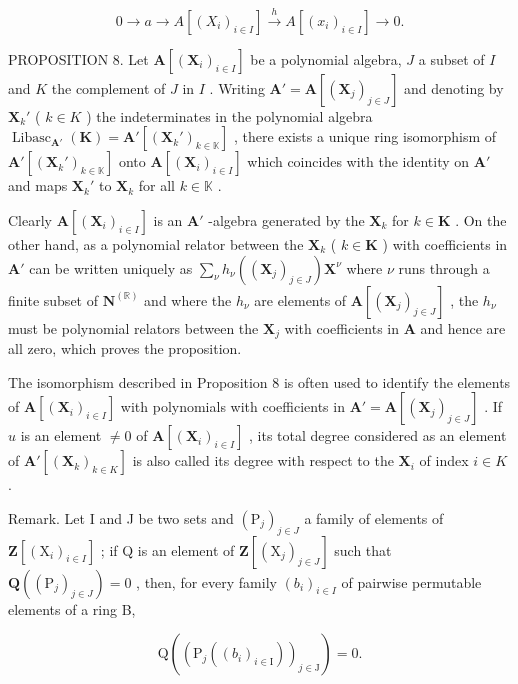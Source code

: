 \[
0 \longrightarrow a \longrightarrow A [ (X _ {i}) _ {i \in I} ] \stackrel {h} {\longrightarrow} A [ (x _ {i}) _ {i \in I} ] \longrightarrow 0.
\]

PROPOSITION 8. Let \(\mathbf{A}[(\mathbf{X}_i)_{i\in I}]\) be a polynomial algebra, \(J\) a subset of \(I\) and \(K\) the complement of \(J\) in \(I\) . Writing \(\mathbf{A}' = \mathbf{A}[(\mathbf{X}_j)_{j\in J}]\) and denoting by \(\mathbf{X}_k'\) ( \(k\in K\) ) the indeterminates in the polynomial algebra \(\operatorname{Libasc}_{\mathbf{A}'}(\mathbf{K}) = \mathbf{A}'[(\mathbf{X}_k')_{k \in \mathbb{K}}]\) , there exists a unique ring isomorphism of \(\mathbf{A}'[(\mathbf{X}_k')_{k \in \mathbb{K}}]\) onto \(\mathbf{A}[(\mathbf{X}_i)_{i \in I}]\) which coincides with the identity on \(\mathbf{A}'\) and maps \(\mathbf{X}_k'\) to \(\mathbf{X}_k\) for all \(k \in \mathbb{K}\) .

Clearly \(\mathbf{A}[(\mathbf{X}_i)_{i\in I}]\) is an \(\mathbf{A}'\) -algebra generated by the \(\mathbf{X}_k\) for \(k\in \mathbf{K}\) . On the other hand, as a polynomial relator between the \(\mathbf{X}_k\) ( \(k\in \mathbf{K}\) ) with coefficients in \(\mathbf{A}'\) can be written uniquely as \(\sum_{\nu}h_{\nu}((\mathbf{X}_j)_{j\in J})\mathbf{X}^{\nu}\) where \(\nu\) runs through a finite subset of \(\mathbf{N}^{(\mathbb{R})}\) and where the \(h_\nu\) are elements of \(\mathbf{A}[(\mathbf{X}_j)_{j\in J}]\) , the \(h_\nu\) must be polynomial relators between the \(\mathbf{X}_j\) with coefficients in \(\mathbf{A}\) and hence are all zero, which proves the proposition.

The isomorphism described in Proposition 8 is often used to identify the elements of \(\mathbf{A}[(\mathbf{X}_i)_{i\in I}]\) with polynomials with coefficients in \(\mathbf{A}' = \mathbf{A}[(\mathbf{X}_j)_{j\in J}]\) . If \(u\) is an element \(\neq 0\) of \(\mathbf{A}[(\mathbf{X}_i)_{i\in I}]\) , its total degree considered as an element of \(\mathbf{A}'[(\mathbf{X}_k)_{k\in K}]\) is also called its degree with respect to the \(\mathbf{X}_i\) of index \(i\in K\) .

Remark. Let I and J be two sets and \((\mathrm{P}_{j})_{j\in J}\) a family of elements of \(\mathbf{Z}[(\mathrm{X}_{i})_{i\in I}]\) ; if Q is an element of \(\mathbf{Z}[(\mathrm{X}_{j})_{j\in J}]\) such that \(\mathbf{Q}((\mathrm{P}_{j})_{j\in J})=0\) , then, for every family \((b_{i})_{i\in I}\) of pairwise permutable elements of a ring B,

\[
\mathrm{Q} ((\mathrm{P} _ {j} ((b _ {i}) _ {i \in \mathrm{I}})) _ {j \in \mathrm{J}}) = 0.
\]

